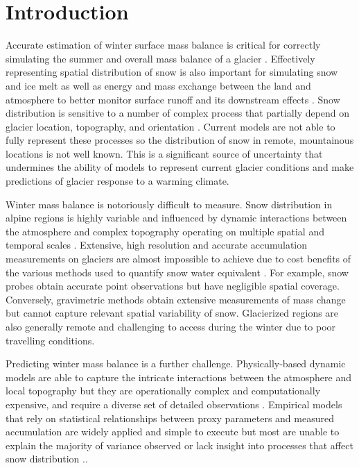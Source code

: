 \documentclass[review,oneside, letterpaper]{igs}
\begin{document}
\section{Introduction}

Accurate estimation of winter surface mass balance is critical for correctly simulating the summer and overall mass balance of a glacier \citep{Reveillet2016}. Effectively representing spatial distribution of snow is also important for simulating snow and ice melt as well as energy and mass exchange between the land and atmosphere to better monitor surface runoff and its downstream effects \citep{Clark2011}. Snow distribution is sensitive to a number of complex process that partially depend on glacier location, topography, and orientation \citep{Bloschl1991, Mott2008, Clark2011, Sold2013}. Current models are not able to fully represent these processes so the distribution of snow in remote, mountainous locations is not well known. This is a significant source of uncertainty that undermines the ability of models to represent current glacier conditions and make predictions of glacier response to a warming climate. 

Winter mass balance is notoriously difficult to measure. Snow distribution in alpine regions is highly variable and influenced by dynamic interactions between the atmosphere and complex topography operating on multiple spatial and temporal scales \citep{Liston2006}. Extensive, high resolution and accurate accumulation measurements on glaciers are almost impossible to achieve due to cost benefits of the various methods used to quantify snow water equivalent \citep{McGrath2015}. For example, snow probes obtain accurate point observations but have negligible spatial coverage. Conversely, gravimetric methods obtain extensive measurements of mass change but cannot capture relevant spatial variability of snow. Glacierized regions are also generally remote and challenging to access during the winter due to poor travelling conditions. 

Predicting winter mass balance is a further challenge. Physically-based dynamic models are able to capture the intricate interactions between the atmosphere and local topography but they are operationally complex and computationally expensive, and require a diverse set of detailed observations \citep{Dadic2010}. Empirical models that rely on statistical relationships between proxy parameters and measured accumulation are widely applied and simple to execute but most are unable to explain the majority of variance observed or lack insight into processes that affect snow distribution \citep[e.g.][]{Grabiec2011,Lopez2011}..
\end{document}
